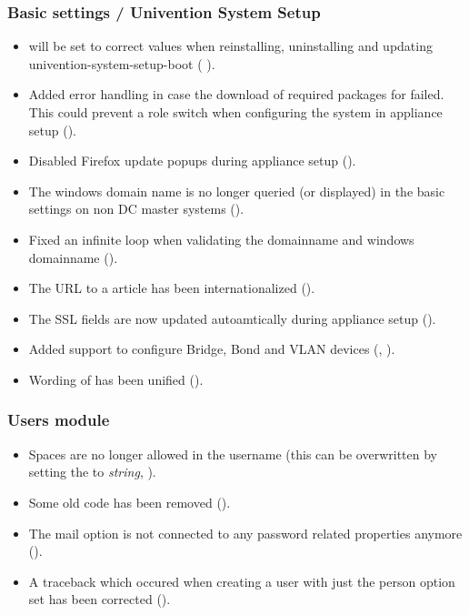 \subsubsection{Basic settings / Univention System Setup}
\begin{itemize}
\item {} will be set to correct values when reinstalling, 
uninstalling and updating univention-system-setup-boot ( ).
\item Added error handling in case the download of required packages for
 failed. This could prevent a
role switch when configuring the system in appliance setup ().
\item Disabled Firefox update popups during appliance setup ().

\item The windows domain name is no longer queried (or displayed) in the basic
settings on non  DC master systems ().

\item Fixed an infinite loop when validating the domainname and windows domainname ().

\item The URL to a  article has been internationalized ().

\item The SSL fields are now updated autoamtically during appliance setup ().

\item Added support to configure Bridge, Bond and VLAN devices (, ).

\item Wording of  has been unified ().

\end{itemize}

\subsubsection{Users module}
\begin{itemize}
\item Spaces are no longer allowed in the username (this can be overwritten by setting the
 to \emph{string}, ).
\item Some old code has been removed ().
\item The mail option is not connected to any password related properties anymore ().
\item A traceback which occured when creating a user with just the person option set has been corrected ().
\end{itemize}

